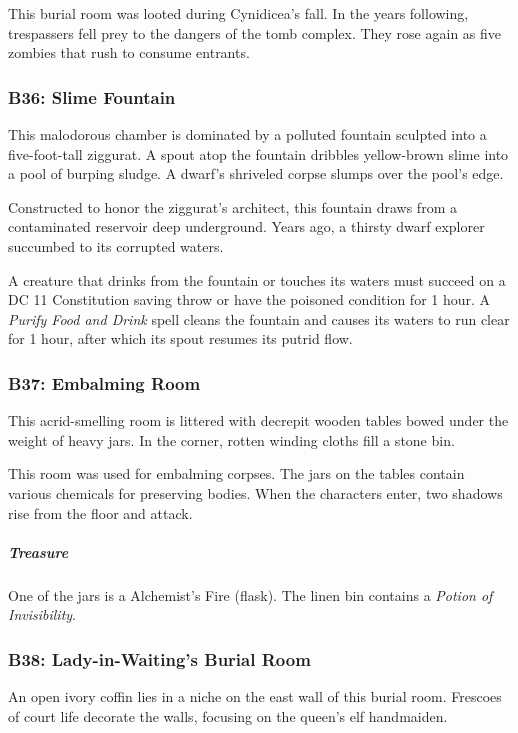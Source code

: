 \documentclass[10pt,a4paper,twoside,bg=print,twocolumn,openany,nodeprecatedcode]{dndbook}
\begin{document}
This burial room was looted during Cynidicea's fall. In the years following, trespassers fell prey to the dangers of the tomb complex. They rose again as five zombies that rush to consume entrants.

\subsubsection{B36: Slime Fountain}
\begin{DndReadAloud}{}
This malodorous chamber is dominated by a polluted fountain sculpted into a five-foot-tall ziggurat. A spout atop the fountain dribbles yellow-brown slime into a pool of burping sludge. A dwarf's shriveled corpse slumps over the pool's edge.

\end{DndReadAloud}

Constructed to honor the ziggurat's architect, this fountain draws from a contaminated reservoir deep underground. Years ago, a thirsty dwarf explorer succumbed to its corrupted waters.

A creature that drinks from the fountain or touches its waters must succeed on a DC 11 Constitution saving throw or have the poisoned condition for 1 hour. A \textit{Purify Food and Drink} spell cleans the fountain and causes its waters to run clear for 1 hour, after which its spout resumes its putrid flow.

\subsubsection{B37: Embalming Room}
\begin{DndReadAloud}{}
This acrid-smelling room is littered with decrepit wooden tables bowed under the weight of heavy jars. In the corner, rotten winding cloths fill a stone bin.

\end{DndReadAloud}

This room was used for embalming corpses. The jars on the tables contain various chemicals for preserving bodies. When the characters enter, two shadows rise from the floor and attack.

\subparagraph{Treasure}
One of the jars is a Alchemist's Fire (flask). The linen bin contains a \textit{Potion of Invisibility}.

\subsubsection{B38: Lady-in-Waiting's Burial Room}
\begin{DndReadAloud}{}
An open ivory coffin lies in a niche on the east wall of this burial room. Frescoes of court life decorate the walls, focusing on the queen's elf handmaiden.

\end{DndReadAloud}
\end{document}
